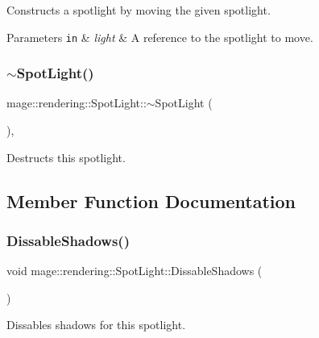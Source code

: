 Constructs a spotlight by moving the given spotlight.


\begin{DoxyParams}[1]{Parameters}
\mbox{\tt in}  & {\em light} & A reference to the spotlight to move. \\
\hline
\end{DoxyParams}
\hypertarget{classmage_1_1rendering_1_1_spot_light_a3ef5b16d174fd45b40d929b8f06cdea3}{}\label{classmage_1_1rendering_1_1_spot_light_a3ef5b16d174fd45b40d929b8f06cdea3} 
\subsubsection{\texorpdfstring{$\sim$\+Spot\+Light()}{~SpotLight()}}
{\footnotesize\ttfamily mage\+::rendering\+::\+Spot\+Light\+::$\sim$\+Spot\+Light (\begin{DoxyParamCaption}{ }\end{DoxyParamCaption})\hspace{0.3cm}{\ttfamily [virtual]}, {\ttfamily [default]}}

Destructs this spotlight. 

\subsection{Member Function Documentation}
\hypertarget{classmage_1_1rendering_1_1_spot_light_a11897283e223ed345a2d04738e7fc267}{}\label{classmage_1_1rendering_1_1_spot_light_a11897283e223ed345a2d04738e7fc267} 
\subsubsection{\texorpdfstring{Dissable\+Shadows()}{DissableShadows()}}
{\footnotesize\ttfamily void mage\+::rendering\+::\+Spot\+Light\+::\+Dissable\+Shadows (\begin{DoxyParamCaption}{ }\end{DoxyParamCaption})\hspace{0.3cm}{\ttfamily [noexcept]}}

Dissables shadows for this spotlight. \hypertarget{classmage_1_1rendering_1_1_spot_light_ace198989b91c5b4ca590dabef5b88e25}{}\label{classmage_1_1rendering_1_1_spot_light_ace198989b91c5b4ca590dabef5b88e25} 
